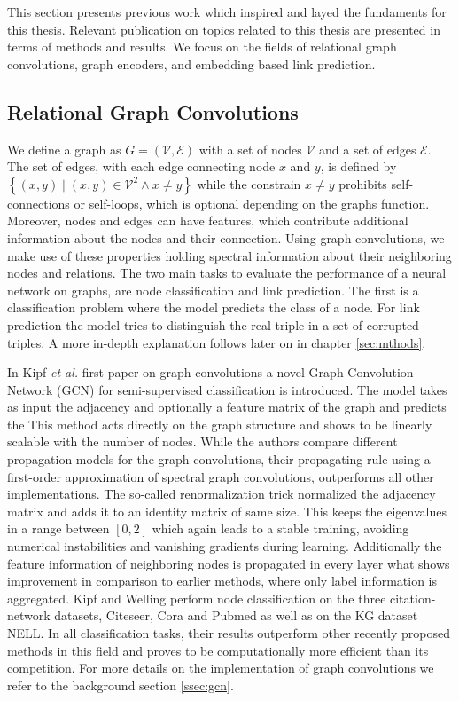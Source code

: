 This section presents previous work which inspired and layed the fundaments for this thesis. Relevant publication on topics related to this thesis are presented in terms of methods and results. We focus on the fields of relational graph convolutions, graph encoders, and embedding based link prediction.

\subsection{Relational Graph Convolutions}
We define a graph as $G=(\mathcal{V}, \mathcal{E})$  with a set of nodes $\mathcal{V}$ and a set of edges $\mathcal{E}$. The set of edges, with each edge connecting node $x$ and $y$, is defined by $\left\{(x, y) \mid(x, y) \in \mathcal{V}^{2} \wedge x \neq y\right\}$ while the constrain $x \neq y$ prohibits self-connections or self-loops, which is optional depending on the graphs function. Moreover, nodes and edges can have features, which contribute additional information about the nodes and their connection. Using graph convolutions, we make use of these properties holding spectral information about their neighboring nodes and relations. The two main tasks to evaluate the performance of a neural network on graphs, are node classification and link prediction. The first is a classification problem where the model predicts the class of a node. For link prediction the model tries to distinguish the real triple in a set of corrupted triples. A more in-depth explanation follows later on in chapter \ref{sec:mthods}.

In Kipf \textit{et al.} first paper on graph convolutions \cite{kipf_semi-supervised_2017} a novel Graph Convolution Network (GCN) for semi-supervised classification is introduced. The model takes as input the adjacency and optionally a feature matrix of the graph and predicts the  This method acts directly on the graph structure and shows to be linearly scalable with the number of nodes. While the authors compare different propagation models for the graph convolutions, their propagating rule using a first-order approximation of spectral graph convolutions, outperforms all other implementations. The so-called renormalization trick normalized the adjacency matrix and adds it to an identity matrix of same size. This keeps the eigenvalues in a range between $[0,2]$ which again leads to a stable training, avoiding numerical instabilities and vanishing gradients during learning. Additionally the feature information of neighboring nodes is propagated in every layer what shows improvement in comparison to earlier methods, where only label information is aggregated.
Kipf and Welling perform node classification on the three citation-network datasets, Citeseer, Cora and Pubmed as well as on the KG dataset NELL. In all classification tasks, their results outperform other recently proposed methods in this field and proves to be computationally more efficient than its competition. For more details on the implementation of graph convolutions we refer to the background section \ref{ssec:gcn}. 


